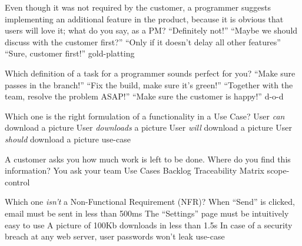 \documentclass{article}
\begin{document}


\pmbaQuestion
  {Even though it was not required by the customer, a programmer suggests implementing an additional feature in the product, because it is obvious that users will love it; what do you say, as a PM?}
  {``Definitely not!''}
  {``Maybe we should discuss with the customer first?''}
  {``Only if it doesn't delay all other features''}
  {``Sure, customer first!''}
  {gold-platting}

\pmbaQuestion
  {Which definition of a task for a programmer sounds perfect for you?}
  {``Make sure  passes in the  branch!''}
  {``Fix the build, make sure it's green!''}
  {``Together with the team, resolve the problem ASAP!''}
  {``Make sure the customer is happy!''}
  {d-o-d}

\pmbaQuestion
  {Which one is the right formulation of a functionality in a Use Case?}
  {User \emph{can} download a picture}
  {User \emph{downloads} a picture}
  {User \emph{will} download a picture}
  {User \emph{should} download a picture}
  {use-case}

\pmbaQuestion
  {A customer asks you how much work is left to be done. Where do you find this information?}
  {You ask your team}
  {Use Cases}
  {Backlog}
  {Traceability Matrix}
  {scope-control}

\pmbaQuestion
  {Which one \emph{isn't} a Non-Functional Requirement (NFR)?}
  {When ``Send'' is clicked, email must be sent in less than 500ms}
  {The ``Settings'' page must be intuitively easy to use}
  {A picture of 100Kb downloads in less than 1.5s}
  {In case of a security breach at any web server, user passwords won't leak}
  {use-case}
\end{document}
